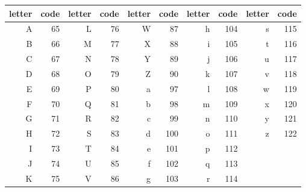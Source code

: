 \begin{tabular}{rrrrrrrrrr}
\toprule
letter&
code&
letter&
code&
letter&
code&
letter&
code&
letter&
code\\
\midrule
A & 65 & L & 76 & W & 87 & h & 104 & s & 115\\
B & 66 & M & 77 & X & 88 & i & 105 & t & 116\\
C & 67 & N & 78 & Y & 89 & j & 106 & u & 117\\
D & 68 & O & 79 & Z & 90 & k & 107 & v & 118\\
E & 69 & P & 80 & a & 97 & l & 108 & w & 119\\
F & 70 & Q & 81 & b & 98 & m & 109 & x & 120\\
G & 71 & R & 82 & c & 99 & n & 110 & y & 121\\
H & 72 & S & 83 & d & 100 & o & 111 & z & 122\\
I & 73 & T & 84 & e & 101 & p & 112 &  & \\
J & 74 & U & 85 & f & 102 & q & 113 &  & \\
K & 75 & V & 86 & g & 103 & r & 114 &  & \\
\bottomrule
\end{tabular}
